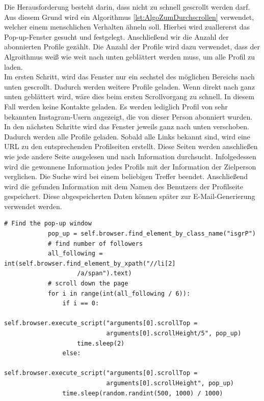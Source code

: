 		Die Herausforderung besteht darin, dass nicht zu schnell gescrollt werden darf. Aus diesem Grund wird ein Algorithmus \ref{lst:AlgoZumDurchscrollen} verwendet, welcher einem menschlichen Verhalten ähneln soll. Hierbei wird zuallererst das Pop-up-Fenster gesucht und festgelegt. Anschließend wir die Anzahl der abonnierten Profile gezählt. Die Anzahl der Profile wird dazu verwendet, dass der Algroithmus weiß wie weit nach unten geblättert werden muss, um alle Profil zu laden.\\
		Im ersten Schritt, wird das Fenster nur ein sechstel des möglichen Bereichs nach unten gescrollt. Dadurch werden weitere Profile geladen. Wenn direkt nach ganz unten geblättert wird, wäre dies beim ersten Scrollvorgang zu schnell. In diesem Fall werden keine Kontakte geladen. Es werden lediglich Profil von sehr bekannten Instagram-Usern angezeigt, die von dieser Person abonniert wurden.\\
		In den nächsten Schritte wird das Fenster jeweils ganz nach unten verschoben. Dadurch werden alle Profile geladen. Sobald alle Links bekannt sind, wird eine URL zu den entsprechenden Profilseiten erstellt. Diese Seiten werden anschließen wie jede andere Seite ausgelesen und nach Information durchsucht. Infolgedessen wird die gewonnene Information jedes Profils mit der Information der Zielperson verglichen. Die Suche wird bei einem beliebigen Treffer beendet. Anschließend wird die gefunden Information mit dem Namen des Benutzers der Profilseite gespeichert. Diese abgespeicherten Daten können später zur E-Mail-Generierung verwendet werden.\\
		
		\begin{lstlisting}[caption=Herunterscrollen des Pop-up Fensters,label={lst:AlgoZumDurchscrollen}]
			# Find the pop-up window
			pop_up = self.browser.find_element_by_class_name("isgrP")        
			# find number of followers
			all_following = int(self.browser.find_element_by_xpath("//li[2]
					/a/span").text)
			# scroll down the page
			for i in range(int(all_following / 6)):
				if i == 0:
					self.browser.execute_script("arguments[0].scrollTop = 
							arguments[0].scrollHeight/5", pop_up)
					time.sleep(2)
				else:
					self.browser.execute_script("arguments[0].scrollTop = 
							arguments[0].scrollHeight", pop_up)
				time.sleep(random.randint(500, 1000) / 1000)
		\end{lstlisting}

